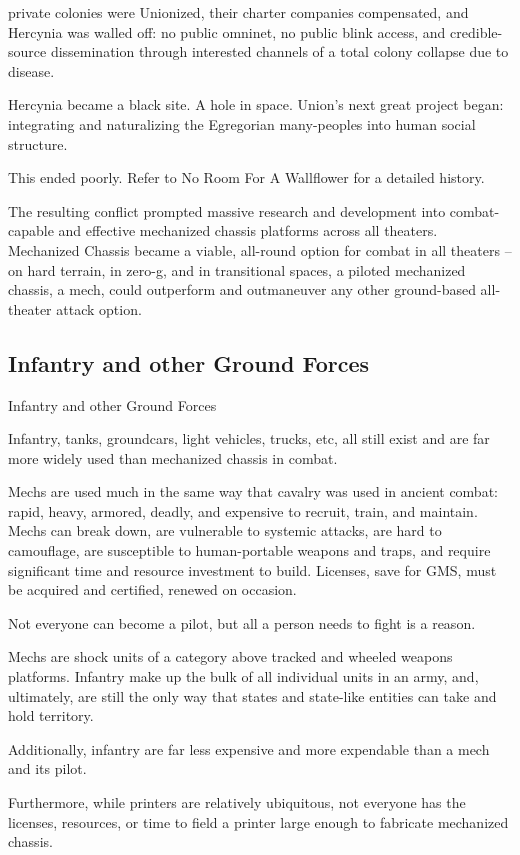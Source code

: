 private colonies were Unionized, their charter companies compensated, and Hercynia was
walled off: no public omninet, no public blink access, and credible-source dissemination through
interested channels of a total colony collapse due to disease.


Hercynia became a black site. A hole in space. Union’s next great project began: integrating and
naturalizing the Egregorian many-peoples into human social structure.


This ended poorly. Refer to No Room For A Wallflower for a detailed history.


The resulting conflict prompted massive research and development into combat-capable and
effective mechanized chassis platforms across all theaters. Mechanized Chassis became a
viable, all-round option for combat in all theaters -- on hard terrain, in zero-g, and in transitional
spaces, a piloted mechanized chassis, a mech, could outperform and outmaneuver any other
ground-based all-theater attack option.
\subsection{Infantry and other Ground Forces}
Infantry and other Ground Forces

Infantry, tanks, groundcars, light vehicles, trucks, etc, all still exist and are far more widely used
than mechanized chassis in combat.


Mechs are used much in the same way that cavalry was used in ancient combat: rapid, heavy,
armored, deadly, and expensive to recruit, train, and maintain. Mechs can break down, are
vulnerable to systemic attacks, are hard to camouflage, are susceptible to human-portable
weapons and traps, and require significant time and resource investment to build. Licenses, save
for GMS, must be acquired and certified, renewed on occasion.


Not everyone can become a pilot, but all a person needs to fight is a reason.


Mechs are shock units of a category above tracked and wheeled weapons platforms. Infantry
make up the bulk of all individual units in an army, and, ultimately, are still the only way that
states and state-like entities can take and hold territory.


Additionally, infantry are far less expensive and more expendable than a mech and its pilot.


Furthermore, while printers are relatively ubiquitous, not everyone has the licenses, resources, or
time to field a printer large enough to fabricate mechanized chassis.


